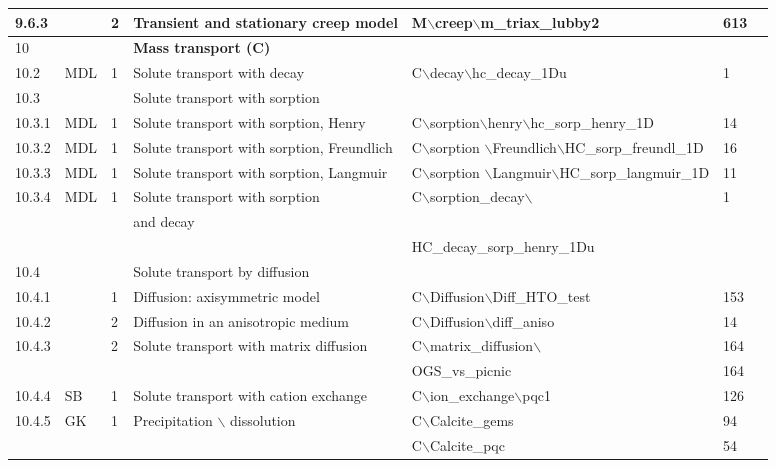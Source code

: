 \begin{landscape}
\begin{center}
\begin{tabularx}{\linewidth}{lllXXll}
9.6.3&&         2&Transient and stationary creep model& M$\backslash$creep$\backslash$m\_triax\_lubby2&613&\\
\midrule

10  & &&        \textbf{Mass transport (C)}&&&\\
10.2  &MDL&1&   Solute transport with decay&    C$\backslash$decay$\backslash$hc\_decay\_1Du&1&\\
10.3  &&        &       Solute transport with sorption&&&\\
10.3.1&MDL&1&   Solute transport with sorption, Henry&C$\backslash$sorption$\backslash$henry$\backslash$hc\_sorp\_henry\_1D&14&\\
10.3.2&MDL&             1&      Solute transport with sorption, Freundlich&     C$\backslash$sorption $\backslash$Freundlich$\backslash$HC\_sorp\_freundl\_1D&16&\\
10.3.3&MDL&             1&      Solute transport with sorption, Langmuir&       C$\backslash$sorption $\backslash$Langmuir$\backslash$HC\_sorp\_langmuir\_1D&11&\\
10.3.4&MDL&             1&      Solute transport with sorption &        C$\backslash$sorption\_decay$\backslash$&1&\\
&&&and decay&&&\\
&&&&HC\_decay\_sorp\_henry\_1Du&&\\
10.4    &&               &      Solute transport by diffusion&&&\\
10.4.1&&                1&      Diffusion: axisymmetric model&  C$\backslash$Diffusion$\backslash$Diff\_HTO\_test&153&\\
10.4.2&&                2&      Diffusion in an anisotropic medium&     C$\backslash$Diffusion$\backslash$diff\_aniso&14&\\
10.4.3&&                2&      Solute transport with matrix diffusion&C$\backslash$matrix\_diffusion$\backslash$ &164&\\
&&&                                                                                                                                                                                                             &OGS\_vs\_picnic&164&\\
10.4.4&SB&      1&      Solute transport with cation exchange&  C$\backslash$ion\_exchange$\backslash$pqc1&126&\\
10.4.5&GK&      1&      Precipitation $\backslash$ dissolution& C$\backslash$Calcite\_gems&94&\\
                        &&&                                                                                                                                                                                     & C$\backslash$Calcite\_pqc&54&\\

\end{tabularx}
\end{center}
\end{landscape}
